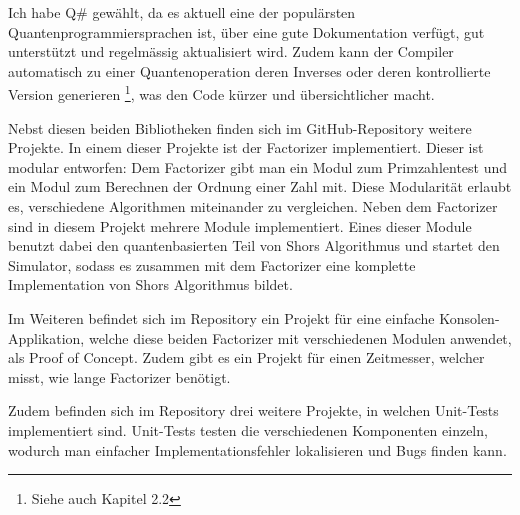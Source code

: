 Ich habe Q\# gewählt, da es aktuell eine der populärsten Quantenprogrammiersprachen ist, über eine gute Dokumentation verfügt, gut unterstützt und regelmässig aktualisiert wird. Zudem kann der Compiler automatisch zu einer Quantenoperation deren Inverses oder deren kontrollierte Version generieren \footnote{Siehe auch Kapitel 2.2}, was den Code kürzer und übersichtlicher macht.

Nebst diesen beiden Bibliotheken finden sich im GitHub-Repository weitere Projekte. In einem dieser Projekte ist der \grqq Factorizer\grqq{} implementiert. Dieser ist modular entworfen: Dem Factorizer gibt man ein Modul zum Primzahlentest und ein Modul zum Berechnen der Ordnung einer Zahl mit. %
Diese Modularität erlaubt es, verschiedene Algorithmen miteinander zu vergleichen. Neben dem \grqq Factorizer\grqq{} sind in diesem Projekt mehrere Module implementiert. Eines dieser Module benutzt dabei den quantenbasierten Teil von Shors Algorithmus und startet den Simulator, sodass es zusammen mit dem \grqq Factorizer\grqq{} eine komplette Implementation von Shors Algorithmus bildet.

Im Weiteren befindet sich im Repository ein Projekt für eine einfache Konsolen-Applikation, welche diese beiden \grqq Factorizer\grqq{} mit verschiedenen Modulen anwendet, als Proof of Concept. Zudem gibt es ein Projekt für einen Zeitmesser, welcher misst, wie lange \grqq Factorizer \grqq{} benötigt.

Zudem befinden sich im Repository drei weitere Projekte, in welchen Unit-Tests implementiert sind. Unit-Tests testen die verschiedenen Komponenten einzeln, wodurch man einfacher Implementationsfehler lokalisieren und Bugs finden kann.
